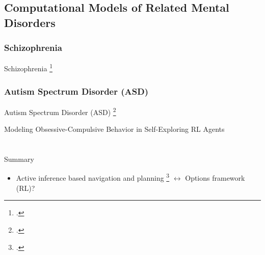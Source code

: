 \documentclass[t,aspectratio=169,xcolor=dvipsnames]{beamer}
\newcommand\blfootcitetext[1]{%
  \begingroup
  \renewcommand\thefootnote{}\footcitetext{#1}%
  \addtocounter{footnote}{-1}%
  \endgroup
}
\newcommand{\citec}[1]{\hfill\textcolor{lightgray}{\citep{#1}}}
\newcommand{\cname}[2]{\texorpdfstring{#1 \citec{#2}}{#1}}
\begin{document}
\subsection{Computational Models of Related Mental Disorders}
{
\subsubsection{\cname{Schizophrenia}{schizophrenia}}
\begin{frame}{Schizophrenia}
    \blfootcitetext{schizophrenia}
    
\end{frame}
\subsubsection{\cname{Autism Spectrum Disorder (ASD)}{asd}}
\begin{frame}{Autism Spectrum Disorder (ASD)}
    \blfootcitetext{asd}
    
\end{frame}
}
\begin{frame}{Modeling Obsessive-Compulsive Behavior in Self-Exploring RL Agents}
\end{frame}

\section*{}
\begin{frame}{Summary}
    \begin{itemize}
        \item Active inference based navigation and planning \footcite{kaplan2018planning} $\longleftrightarrow$ Options framework (RL)?
    \end{itemize}
\end{frame}


\end{document}
